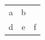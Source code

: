 \documentclass{article}
\begin{document}
\begin{tabular}{c|c|c}
a & \multicolumn{1}{c}{b}\cellx{c} \\
d & e & f
\end{tabular}
\end{document}
